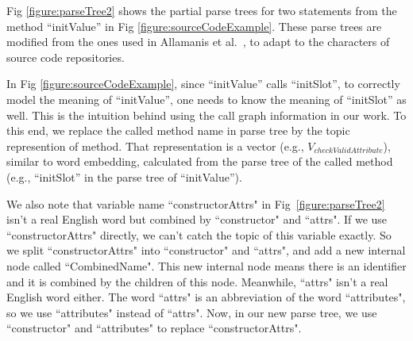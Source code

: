 Fig \ref{figure:parseTree2} shows the partial parse trees  for two
statements from the method ``initValue'' in
Fig \ref{figure:sourceCodeExample}. These parse trees are modified
from the ones used in Allamanis et al.~,
to adapt to the characters of source code repositories.

In Fig \ref{figure:sourceCodeExample}, since ``initValue'' calls
``initSlot'', to correctly model the meaning of ``initValue'', one needs to
know the meaning of ``initSlot'' as well. This is the intuition behind using
the call graph information in our work. To this end, we replace the
called method name in parse tree by the topic represention of method.
That representation is a vector (e.g., $V_{checkValidAttribute}$),
similar to word embedding, calculated
from the parse tree of the called method (e.g., ``initSlot''
in the parse tree of ``initValue'').

We also note that variable name ``constructorAttrs" in Fig~\ref{figure:parseTree2} isn't a real English word but combined by ``constructor" and ``attrs". If we use ``constructorAttrs" directly, we can't catch the topic of this variable exactly. So we split ``constructorAttrs" into ``constructor" and ``attrs", and add a new internal node called ``CombinedName". This new internal node means there is an identifier and it is combined by the children of this node. Meanwhile, ``attrs" isn't a real English word either. The word ``attrs" is an abbreviation of the word ``attributes", so we use ``attributes" instead of ``attrs". Now, in our new parse tree, we use ``constructor" and ``attributes" to replace ``constructorAttrs".

